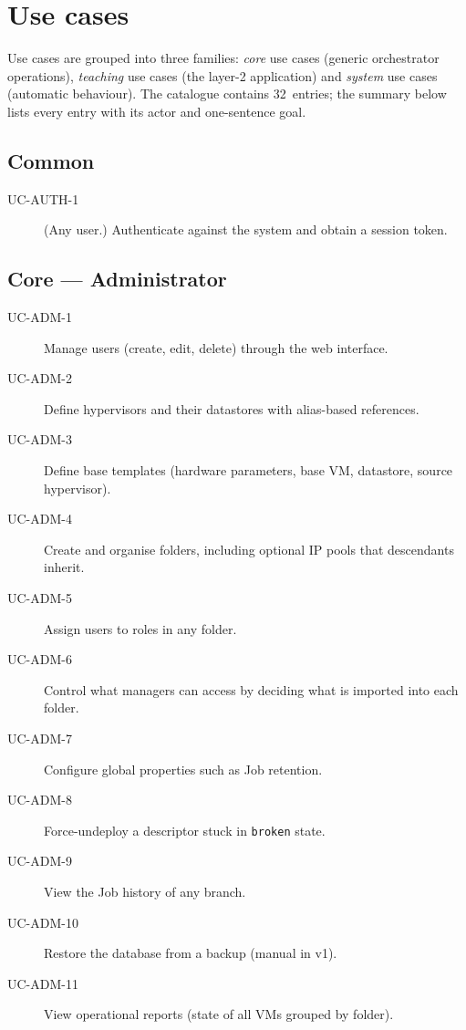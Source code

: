 \section{Use cases}

Use cases are grouped into three families: \emph{core} use cases
(generic orchestrator operations), \emph{teaching} use cases (the
layer-2 application) and \emph{system} use cases (automatic
behaviour). The catalogue contains 32~entries; the summary below
lists every entry with its actor and one-sentence goal.

\subsection{Common}

\begin{description}
  \item[UC-AUTH-1] (Any user.) Authenticate against the system and
        obtain a session token.
\end{description}

\subsection{Core --- Administrator}

\begin{description}
  \item[UC-ADM-1] Manage users (create, edit, delete) through the
        web interface.
  \item[UC-ADM-2] Define hypervisors and their datastores with
        alias-based references.
  \item[UC-ADM-3] Define base templates (hardware parameters, base
        VM, datastore, source hypervisor).
  \item[UC-ADM-4] Create and organise folders, including optional
        IP pools that descendants inherit.
  \item[UC-ADM-5] Assign users to roles in any folder.
  \item[UC-ADM-6] Control what managers can access by deciding what
        is imported into each folder.
  \item[UC-ADM-7] Configure global properties such as Job retention.
  \item[UC-ADM-8] Force-undeploy a descriptor stuck in
        \texttt{broken} state.
  \item[UC-ADM-9] View the Job history of any branch.
  \item[UC-ADM-10] Restore the database from a backup (manual in
        v1).
  \item[UC-ADM-11] View operational reports (state of all VMs
        grouped by folder).
\end{description}

